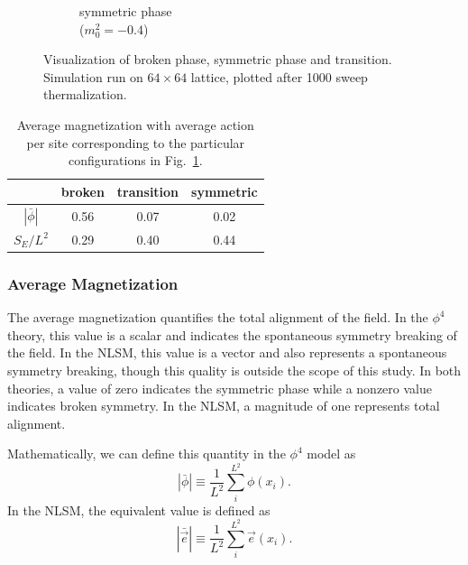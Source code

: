 \documentclass[12pt]{report}
\newcommand{\e}{\vec e}
\begin{document}
\begin{figure}[h]
\begin{center}
\begin{subfigure}[b]{0.3\textwidth}
        \caption{symmetric phase \\($m_0^2=-0.4$)}
      \end{subfigure}
      \hfill
      \caption{\label{fig:primary observables} Visualization of broken phase, symmetric phase and transition. Simulation run on $64\times64$ lattice, plotted after 1000 sweep thermalization.}
  \end{center}
\end{figure}

\begin{table}[h]
    \begin{center}
    {\renewcommand{\arraystretch}{1.2} %
    \begin{tabular}{ c|| c | c | c}
        & broken & transition & symmetric \\ \hline
        $|\bar\phi|$ & 0.56 & 0.07 & 0.02 \\ 
        $S_E/L^2$ & 0.29 & 0.40 & 0.44
    \end{tabular}}

    \end{center}
    \caption{\label{tab:primary observables} Average magnetization with average action per site corresponding to the particular configurations in Fig.~\ref{fig:primary observables}.}
\end{table}

\subsubsection{Average Magnetization}
The average magnetization quantifies the total alignment of the field. In the $\phi^4$ theory, this value is a scalar and indicates the spontaneous symmetry breaking of the field. In the NLSM, this value is a vector and also represents a spontaneous symmetry breaking, though this quality is outside the scope of this study. In both theories, a value of zero indicates the symmetric phase while a nonzero value indicates broken symmetry. In the NLSM, a magnitude of one represents total alignment.

Mathematically, we can define this quantity in the $\phi^4$ model as 
\begin{equation}
    |\bar\phi| \equiv \frac{1}{L^2}\sum_i^{L^2} \phi(x_i).
\end{equation}
In the NLSM, the equivalent value is defined as 
\begin{equation}
    |\bar\e| \equiv \frac{1}{L^2}\sum_i^{L^2} \e(x_i).
\end{equation}
\end{document}
